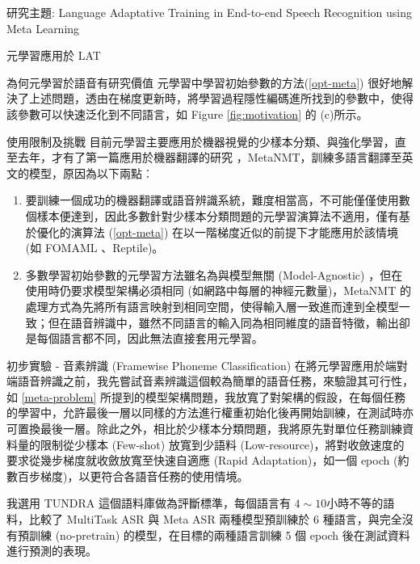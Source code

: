 \documentclass[12pt,UTF8,fntef]{article}
\begin{document}
\begin{section}{研究主題: Language Adaptative Training in End-to-end Speech Recognition using Meta Learning}
\begin{subsection}{元學習應用於 LAT}
\begin{subsubsection}{為何元學習於語音有研究價值}
      元學習中學習初始參數的方法(\ref{opt-meta}) 很好地解決了上述問題，透由在梯度更新時，將學習過程隱性編碼進所找到的參數中，使得該參數可以快速泛化到不同語言，如 Figure \ref{fig:motivation} 的 (c)所示。
    \end{subsubsection}
    \begin{subsubsection}{使用限制及挑戰} \label{meta-problem}
      目前元學習主要應用於機器視覺的少樣本分類、與強化學習，直至去年，才有了第一篇應用於機器翻譯的研究 \cite{gu2018meta}，MetaNMT，訓練多語言翻譯至英文的模型，原因為以下兩點︰
      \begin{enumerate}[itemsep=-1mm]
        \item 要訓練一個成功的機器翻譯或語音辨識系統，難度相當高，不可能僅僅使用數個樣本便達到，因此多數針對少樣本分類問題的元學習演算法不適用，僅有基於優化的演算法 (\ref{opt-meta}) 在以一階梯度近似的前提下才能應用於該情境 (如 FOMAML \cite{finn2017model}、Reptile\cite{nichol2018first})。
        \item 多數學習初始參數的元學習方法雖名為與模型無關 (Model-Agnostic) ，但在使用時仍要求模型架構必須相同 (如網路中每層的神經元數量)，MetaNMT 的處理方式為先將所有語言映射到相同空間，使得輸入層一致進而達到全模型一致；但在語音辨識中，雖然不同語言的輸入同為相同維度的語音特徵，輸出卻是每個語言都不同，因此無法直接套用元學習。
      \end{enumerate}
    \end{subsubsection}
    \begin{subsubsection}{初步實驗 - 音素辨識 (Framewise Phoneme Classification)}
      在將元學習應用於端對端語音辨識之前，我先嘗試音素辨識這個較為簡單的語音任務，來驗證其可行性，如 \ref{meta-problem} 所提到的模型架構問題，我放寬了對架構的假設，在每個任務的學習中，允許最後一層以同樣的方法進行權重初始化後再開始訓練，在測試時亦可置換最後一層。除此之外，相比於少樣本分類問題，我將原先對單位任務訓練資料量的限制從少樣本 (Few-shot) 放寬到少語料 (Low-resource)，將對收斂速度的要求從幾步梯度就收斂放寬至快速自適應 (Rapid Adaptation)，如一個 epoch (約數百步梯度)，以更符合各語音任務的使用情境。

      我選用 TUNDRA \cite{stan2013tundra} 這個語料庫做為評斷標準，每個語言有 $4 \sim 10$小時不等的語料，比較了 MultiTask ASR 與 Meta ASR 兩種模型預訓練於 6 種語言，與完全沒有預訓練 (no-pretrain) 的模型，在目標的兩種語言訓練 5 個 epoch 後在測試資料進行預測的表現。

    \begin{figure}[H]
    \centering
    \hspace{-5.2cm}
\end{figure}
\end{subsubsection}
\end{subsection}
\end{section}
\end{document}
